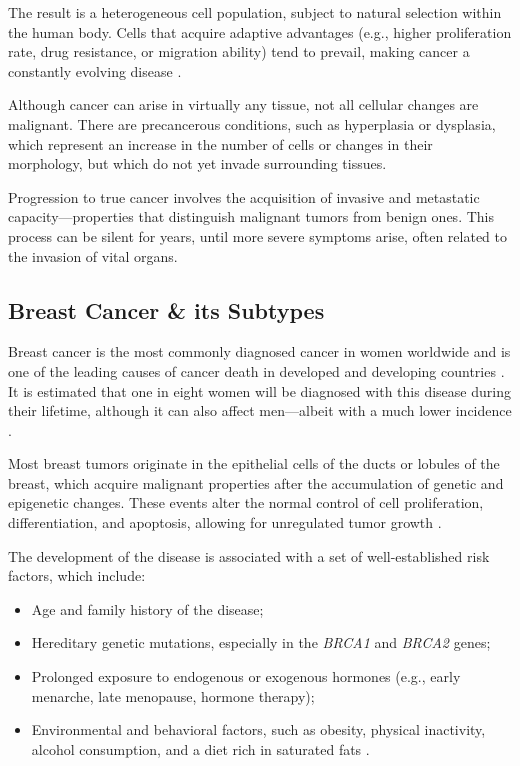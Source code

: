 The result is a heterogeneous cell population, subject to natural selection
within the human body. Cells that acquire adaptive advantages (e.g., higher
proliferation rate, drug resistance, or migration ability) tend to prevail,
making cancer a constantly evolving disease \textcite{def_of_cancer_Brown2023}.

Although cancer can arise in virtually any tissue, not all cellular changes are
malignant. There are precancerous conditions, such as hyperplasia or dysplasia,
which represent an increase in the number of cells or changes in their
morphology, but which do not yet invade surrounding tissues.

Progression to true cancer involves the acquisition of invasive and metastatic
capacity—properties that distinguish malignant tumors from benign ones. This
process can be silent for years, until more severe symptoms arise, often
related to the invasion of vital organs.

\subsection*{Breast Cancer \& its Subtypes}

Breast cancer is the most commonly diagnosed cancer in women worldwide and is
one of the leading causes of cancer death in developed and developing countries
\textcite{BreastEpidemiology_Romanowicz2022, updatedbca_Hong2022Breast}. It is
estimated that one in eight women will be diagnosed with this disease during
their lifetime, although it can also affect men—albeit with a much lower
incidence \textcite{BreastEpidemiology_Romanowicz2022}.

Most breast tumors originate in the epithelial cells of the ducts or lobules of
the breast, which acquire malignant properties after the accumulation of
genetic and epigenetic changes. These events alter the normal control of cell
proliferation, differentiation, and apoptosis, allowing for unregulated tumor
growth \textcite{origins_and_evolution_bca_Polyak2007}.

The development of the disease is associated with a set of well-established
risk factors, which include:
\begin{itemize}
  \item Age and family history of the disease;
  \item Hereditary genetic mutations, especially in the \textit{BRCA1} and
        \textit{BRCA2} genes;
  \item Prolonged exposure to endogenous or exogenous hormones (e.g., early menarche,
        late menopause, hormone therapy);
  \item Environmental and behavioral factors, such as obesity, physical inactivity,
        alcohol consumption, and a diet rich in saturated fats
        \textcite{BreastEpidemiology_Romanowicz2022,clinical_implication_bca_Adamo2015}.
\end{itemize}

